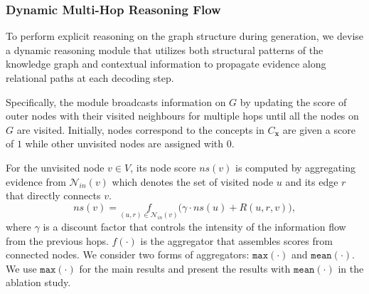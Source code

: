\documentclass[11pt,a4paper]{article}
\begin{document}

\subsubsection{Dynamic Multi-Hop Reasoning Flow}\label{sec:dmrf}

To perform explicit reasoning on the graph structure during generation, we devise a dynamic reasoning module that utilizes both structural patterns of the knowledge graph and contextual information to propagate evidence along relational paths at each decoding step. %

Specifically, the module broadcasts information on $G$ by updating the score of outer nodes with their visited neighbours for multiple hops until all the nodes on $G$ are visited. Initially, nodes correspond to the concepts in $C_{\bm{x}}$ are given a score of $1$ while other unvisited nodes are assigned with $0$.



For the unvisited node $v\in V$, its node score $ns(v)$ is computed by aggregating evidence from $\mathcal{N}_{in}(v)$ which denotes the set of visited node $u$ and its edge $r$ that directly connects $v$.
\begin{equation}
    ns(v) = \underset{(u, r)\in \mathcal{N}_{in}(v)}{f}\Big(\gamma \cdot ns(u) + R(u,r,v) \Big),
\end{equation}
where $\gamma$ is a discount factor that controls the intensity of the information flow from the previous hops. $f(\cdot)$ is the aggregator that assembles scores from connected nodes. We consider two forms of aggregators: $\texttt{max}(\cdot)$ and $\texttt{mean}(\cdot)$. We use $\texttt{max}(\cdot)$ for the main results and present the results with $\texttt{mean}(\cdot)$ in the ablation study. 
\end{document}
